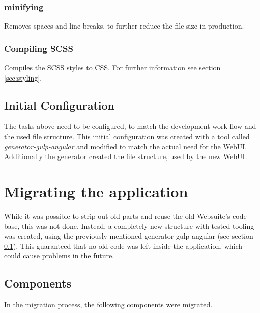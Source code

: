 \subsubsection{minifying} Removes spaces and line-breaks, to further reduce the file size in production.

\subsubsection{Compiling SCSS}
Compiles the SCSS styles to CSS. For further information see section \ref{sec:styling}.


\subsection{Initial Configuration}
\label{sec:initial_config}
The tasks above need to be configured, to match the development work-flow and the used file structure. This initial configuration was created with a tool called \textit{generator-gulp-angular} and modified to match the actual need for the WebUI. Additionally the generator created the file structure, used by the new WebUI.



\section{Migrating the application}
While it was possible to strip out old parts and reuse the old Websuite's code-base, this was not done. Instead, a completely new structure with tested tooling was created, using the previously mentioned generator-gulp-angular (see section \ref{sec:initial_config}). This guaranteed that no old code was left inside the application, which could cause problems in the future.\\


\subsection{Components}
In the migration process, the following components were migrated.

